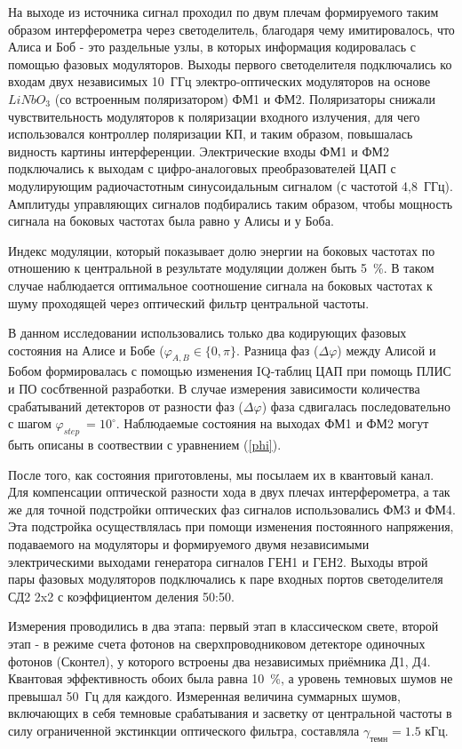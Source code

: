 На выходе из источника сигнал проходил по двум плечам формируемого таким образом интерферометра через светоделитель, благодаря чему имитировалось, что Алиса и Боб - это раздельные узлы, в которых информация кодировалась с помощью фазовых модуляторов. Выходы первого светоделителя подключались ко входам двух независимых 10~ГГц электро-оптических модуляторов на основе $LiNbO_3$ (со встроенным поляризатором) ФМ1 и ФМ2. Поляризаторы снижали чувствительность модуляторов к поляризации входного излучения, для чего использовался контроллер поляризации КП, и таким образом, повышалась видность картины интерференции. Электрические входы ФМ1 и ФМ2 подключались к выходам с цифро-аналоговых преобразователей ЦАП с модулирующим радиочастотным синусоидальным сигналом (с частотой 4,8~ГГц). Амплитуды управляющих сигналов подбирались таким образом, чтобы мощность сигнала на боковых частотах была равно у Алисы и у Боба. 


Индекс модуляции, который показывает долю энергии на боковых частотах по отношению к центральной в результате модуляции должен быть 5~\%. В таком случае наблюдается оптимальное соотношение сигнала на боковых частотах к шуму проходящей через оптический фильтр центральной частоты.  

В данном исследовании  использовались только два кодирующих фазовых состояния на Алисе и Бобе ($\varphi_{A,B}\in\{0,\pi\}$. Разница фаз ($\Delta\varphi$) между Алисой и Бобом формировалась с помощью изменения IQ-таблиц ЦАП при помощь ПЛИС и ПО сосбтвенной разработки. В случае измерения зависимости количества срабатываний детекторов от разности фаз ($\Delta\varphi$) фаза сдвигалась последовательно с шагом $\varphi_{step}\ = 10^{\circ}$. Наблюдаемые состояния на выходах ФМ1 и ФМ2 могут быть описаны в соотвествии с уравнением (\ref{phi}).

После того, как состояния приготовлены, мы посылаем их в квантовый канал. Для компенсации оптической разности хода в двух плечах интерферометра, а так же для точной подстройки оптических фаз сигналов использовались ФМ3 и ФМ4. Эта подстройка осуществлялась при помощи изменения постоянного напряжения, подаваемого на модуляторы и формируемого двумя независимыми электрическими выходами генератора сигналов ГЕН1 и ГЕН2. Выходы втрой пары фазовых модуляторов подключались к паре входных портов светоделителя СД2 2x2 с коэффициентом деления 50:50.

Измерения проводились в два этапа: первый этап в классическом свете, второй этап - в режиме счета фотонов на сверхпроводниковом детекторе одиночных фотонов (Сконтел), у которого встроены два независимых приёмника Д1, Д4. Квантовая эффективность обоих была равна 10~\%, а уровень темновых шумов не превышал 50~Гц для каждого. Измеренная величина суммарных шумов, включающих в себя темновые срабатывания и засветку от центральной частоты в силу ограниченной экстинкции оптического фильтра, составляла $\gamma_{темн}=1.5$ кГц.

